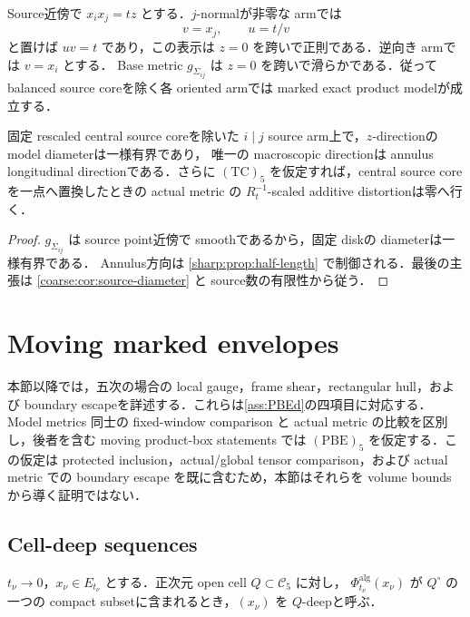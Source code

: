 \documentclass[a4paper,11pt]{ltjsarticle}
\numberwithin{equation}{section}
\theoremstyle{plain}
\theoremstyle{definition}
\theoremstyle{remark}
\newcommand{\cC}{\mathcal C}\newcommand{\cK}{\mathcal K}\newcommand{\cT}{\mathcal T}\newcommand{\cD}{\mathcal D}
\begin{document}
Source近傍で $x_ix_j=tz$ とする．$j$-normalが非零な armでは
\[
 v=x_j,\qquad u=t/v
\]
と置けば $uv=t$ であり，この表示は $z=0$ を跨いで正則である．逆向き armでは $v=x_i$ とする．
Base metric $g_{\Sigma_{ij}}$ は $z=0$ を跨いで滑らかである．従って balanced source coreを除く各 oriented armでは
marked exact product modelが成立する．

\begin{proposition}\label{sharp:prop:source-arm}
固定 rescaled central source coreを除いた $i\mid j$ source arm上で，$z$-directionの model diameterは一様有界であり，
唯一の macroscopic directionは annulus longitudinal directionである．さらに $\mathrm{(TC)}_5$ を仮定すれば，central source coreを一点へ置換したときの
actual metric の $R_t^{-1}$-scaled additive distortionは零へ行く．
\end{proposition}

\begin{proof}
$g_{\Sigma_{ij}}$ は source point近傍で smoothであるから，固定 diskの diameterは一様有界である．
Annulus方向は \cref{sharp:prop:half-length} で制御される．最後の主張は \cref{coarse:cor:source-diameter} と source数の有限性から従う．
\end{proof}


\section{Moving marked envelopes}\label{sharp:sec:moving-envelopes}

本節以降では，五次の場合の local gauge，frame shear，rectangular hull，および boundary escapeを詳述する．これらは\cref{ass:PBEd}の四項目に対応する．Model metrics 同士の fixed-window comparison と actual metric の比較を区別し，後者を含む moving product-box statements では $\mathrm{(PBE)}_5$ を仮定する．この仮定は protected inclusion，actual/global tensor comparison，および actual metric での boundary escape を既に含むため，本節はそれらを volume bounds から導く証明ではない．

\subsection{Cell-deep sequences}

\begin{definition}\label{sharp:def:cell-deep}
$t_\nu\to0$，$x_\nu\in E_{t_\nu}$ とする．正次元 open cell $Q\subset\cC_5$ に対し，
$\Phi_{t_\nu}^{\mathrm{alg}}(x_\nu)$ が $Q^\circ$ の一つの compact subsetに含まれるとき，$(x_\nu)$ を $Q$-deepと呼ぶ．
\end{definition}
\end{document}

